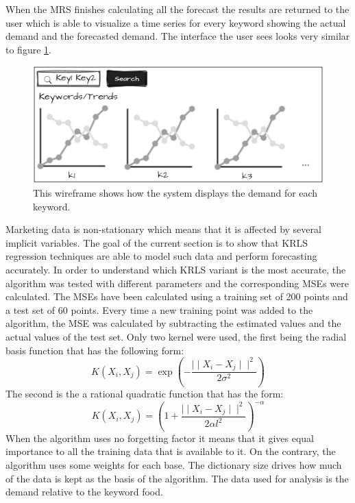 When the \ac{MRS} finishes calculating all the forecast the results are returned to the user which is able to visualize a time series for every keyword showing the actual demand and the forecasted demand. The interface the user sees looks very similar to figure \ref{Implementation:Keywords}.

\begin{figure}[h!]
	\centering
	\includegraphics[scale=0.68]{img/keywords.png}
	\caption{This wireframe shows how the system displays the demand for each keyword.}
	\label{Implementation:Keywords}
\end{figure}

Marketing data is non-stationary which means that it is affected by several implicit variables. The goal of the current section is to show that \ac{KRLS} regression techniques are able to model such data and perform forecasting accurately. In order to understand which \ac{KRLS} variant is the most accurate, the algorithm was tested with different parameters and the corresponding \ac{MSE}s were calculated. The \ac{MSE}s have been calculated using a training set of 200 points and a test set of 60 points. Every time a new training point was added to the algorithm, the \ac{MSE} was calculated by subtracting the estimated values and the actual values of the test set. Only two kernel were used, the first being the radial basis function that has the following form:
\[K(X_i, X_j) = \exp(-\frac{\mid\mid X_i - X_j \mid\mid^2}{2\sigma^2})\]
The second is the a rational quadratic function that has the form:
\[K(X_i, X_j) = (1+\frac{\mid\mid X_i - X_j \mid\mid^2}{2\alpha l^2})^{-\alpha}\] 
When the algorithm uses no forgetting factor it means that it gives equal importance to all the training data that is available to it. On the contrary, the algorithm uses some weights for each base. The dictionary size drives how much of the data is kept as the basis of the algorithm. The data used for analysis is the demand relative to the keyword food.  


